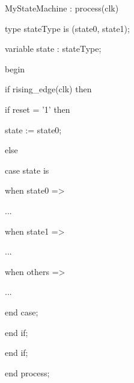 \documentclass[
]{article}
\begin{document}
MyStateMachine : process(clk)

type stateType is (state0, state1);

variable state : stateType;

begin

if rising\_edge(clk) then

if reset = '1' then

state := state0;

else

case state is

when state0 =\textgreater{}

...

when state1 =\textgreater{}

...

when others =\textgreater{}

...

end case;

end if;

end if;

end process;
\end{document}
